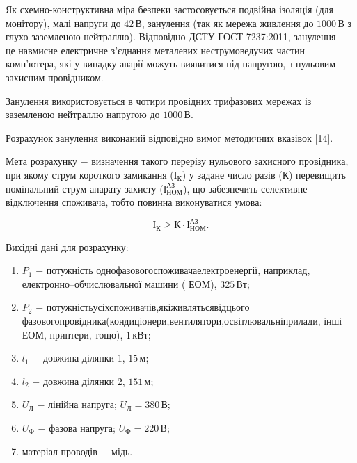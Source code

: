 	Як схемно-конструктивна міра безпеки застосовується подвійна ізоляція (для монітору), малі напруги до $42 \, \text{В}$, занулення (так як мережа живлення до $1000 \, \text{В}$ з глухо заземленою нейтраллю). Відповідно ДСТУ ГОСТ 7237:2011, занулення $-$ це навмисне електричне з’єднання металевих неструмоведучих частин комп’ютера, які у випадку аварії можуть виявитися під напругою, з нульовим захисним провідником.

Занулення використовується в чотири провідних трифазових мережах із заземленою нейтраллю напругою до $1000 \, \text{В}$.

Розрахунок занулення виконаний відповідно вимог методичних вказівок [14].

Мета розрахунку $-$ визначення такого перерізу нульового захисного провідника, при якому струм короткого замикання ($\text{І}_{\text{К}}$) у задане число разів ($\text{К}$) перевищить номінальний струм апарату захисту ($\text{І}^{\text{АЗ}}_{\text{НОМ}}$), що забезпечить селективне відключення споживача, тобто повинна виконуватися умова:

\begin{equation}\label{eq:work1}
	\text{І}_{\text{К}} \ge \text{К} \cdot \text{І}^{\text{АЗ}}_{\text{НОМ}}.
\end{equation}

\vspace{1.5em}

Вихідні дані для розрахунку:

\begin{enumerate}
	\item $P_{1}$ $-$ потужність \hfill однофазового\hfill споживача\hfill електроенергії,\newline \hspace*{-18mm} наприклад, електронно–обчислювальної машини ( ЕОМ), $325 \, \text{Вт}$;
	\item $P_{2}$ $-$ потужність\hfill усіх\hfill споживачів,\hfill які\hfill живляться\hfill від\hfill цього\newline \hspace*{-18mm} фазового\hfill провідника\hfill (кондиціонери,\hfill вентилятори,\hfill освітлювальні\hfill прилади,\newline \hspace*{-18mm} інші ЕОМ, принтери, тощо), $1 \, \text{кВт}$;
	\item $l_{1}$ $-$ довжина ділянки 1, $15 \, \text{м}$;
	\item $l_{2}$ $-$ довжина ділянки 2, $151 \, \text{м}$;
	\item $U_{\text{Л}}$ $-$ лінійна напруга; $U_{\text{Л}} = 380 \, \text{В}$; 
	\item $U_{\text{Ф}}$ $-$ фазова напруга; $U_{\text{Ф}} = 220 \, \text{В}$; 
	\item матеріал проводів $-$ мідь.
\end{enumerate}

